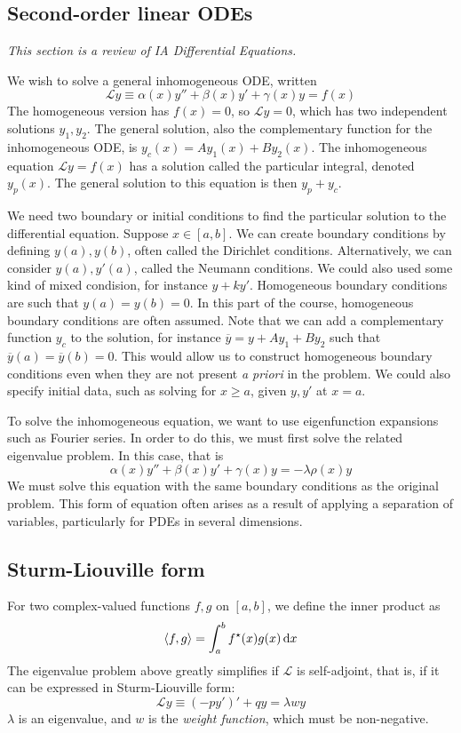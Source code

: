 \subsection{Second-order linear ODEs}
\textit{This section is a review of IA Differential Equations.}

We wish to solve a general inhomogeneous ODE, written
\[
	\mathcal L y \equiv \alpha(x) y'' + \beta(x) y' + \gamma(x) y = f(x)
\]
The homogeneous version has \( f(x) = 0 \), so \( \mathcal L y = 0 \), which has two independent solutions \( y_1, y_2 \).
The general solution, also the complementary function for the inhomogeneous ODE, is \( y_c(x) = A y_1(x) + B y_2(x) \).
The inhomogeneous equation \( \mathcal L y = f(x) \) has a solution called the particular integral, denoted \( y_p(x) \).
The general solution to this equation is then \( y_p + y_c \).

We need two boundary or initial conditions to find the particular solution to the differential equation.
Suppose \( x \in [a,b] \).
We can create boundary conditions by defining \( y(a), y(b) \), often called the Dirichlet conditions.
Alternatively, we can consider \( y(a), y'(a) \), called the Neumann conditions.
We could also used some kind of mixed condision, for instance \( y + ky' \).
Homogeneous boundary conditions are such that \( y(a) = y(b) = 0 \).
In this part of the course, homogeneous boundary conditions are often assumed.
Note that we can add a complementary function \( y_c \) to the solution, for instance \( \overline{y} = y + A y_1 + B y_2 \) such that \( \overline{y}(a) = \overline{y}(b) = 0 \).
This would allow us to construct homogeneous boundary conditions even when they are not present \textit{a priori} in the problem.
We could also specify initial data, such as solving for \( x \geq a \), given \( y, y' \) at \( x = a \).

To solve the inhomogeneous equation, we want to use eigenfunction expansions such as Fourier series.
In order to do this, we must first solve the related eigenvalue problem.
In this case, that is
\[
	\alpha(x) y'' + \beta(x) y' + \gamma(x) y = -\lambda \rho(x) y
\]
We must solve this equation with the same boundary conditions as the original problem.
This form of equation often arises as a result of applying a separation of variables, particularly for PDEs in several dimensions.

\subsection{Sturm-Liouville form}
For two complex-valued functions \( f, g \) on \( [a,b] \), we define the inner product as
\[
	\left\langle{f,g}\right\rangle = \int_a^b f^\star(x) g(x) \dd{x}
\]
The eigenvalue problem above greatly simplifies if \( \mathcal L \) is self-adjoint, that is, if it can be expressed in Sturm-Liouville form:
\[
	\mathcal L y \equiv (-py')' + qy = \lambda w y
\]
\( \lambda \) is an eigenvalue, and \( w \) is the \textit{weight function}, which must be non-negative.


